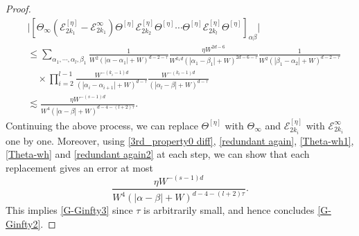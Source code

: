 \documentclass{article}
\newcommand{\1}{\mathds{1}}
\numberwithin{equation}{section}
\newcommand{\al}{\alpha}
\renewcommand{\cal}{\mathcal}
\renewcommand{\leq}{\leqslant}
\renewcommand{\le}{\leq}
\theoremstyle{plain} %
\theoremstyle{remark}
\newcommand{\Sinfty}{\Sigma^{\infty}}
\newcommand{\Sele}{{\mathcal E}}
\begin{document}
\begin{proof}
\begin{align*}
&\Big|\left[\Theta_\infty \left( \Sele^{[\eta]}_{2k_1}- \Sele^{\infty}_{2k_1}\right)\Theta^{[\eta]}  \Sele^{[\eta]}_{2k_2}\Theta^{[\eta]} \cdots \Theta^{[\eta]}  \Sele^{[\eta]}_{2k_l}\Theta^{[\eta]}\right]_{\al\beta}\Big|\\
& \le \sum_{\al_1,\cdots,\al_l,\beta_1}\frac{1}{W^2(| \al-\al_1|+W)^{d-2-\tau}} \frac{\eta W^{2d-6}}{W^{k_1d}(| \al_1-\beta_1|+W)^{2d-6-\tau}} \frac{1}{W^2(|\beta_1-\al_2|+W)^{d-2-\tau}} \\
&\quad \times \prod_{i=2}^{l-1} \frac{W^{-(k_i-1)d}}{(| \al_i-\al_{i+1}|+W)^{d-\tau}}\frac{W^{-(k_l-1)d}}{(| \al_l-\beta|+W)^{d-\tau} }\\
&\lesssim \frac{\eta W^{-(s-1)d}}{W^4( | \al-\beta|+W)^{d-4-(l+2)\tau}}.
\end{align*}
Continuing the above process, we can replace $\Theta^{[\eta]}$ with $\Theta_\infty$ and $\Sele^{[\eta]}_{2k_i}$ with $\Sele^{\infty}_{2k_i}$ one by one. Moreover, using \eqref{3rd_property0 diff}, \eqref{redundant again}, \eqref{Theta-wh1}, \eqref{Theta-wh} and \eqref{redundant again2} at each step, we can show that each replacement gives an error at most 
$$\frac{\eta W^{-(s-1)d}}{W^4( | \al-\beta|+W)^{d-4-(l+2)\tau}}.$$ This implies \eqref{G-Ginfty3} since $\tau$ is arbitrarily small, and hence concludes \eqref{G-Ginfty2}. 

\end{proof}
\end{document}
